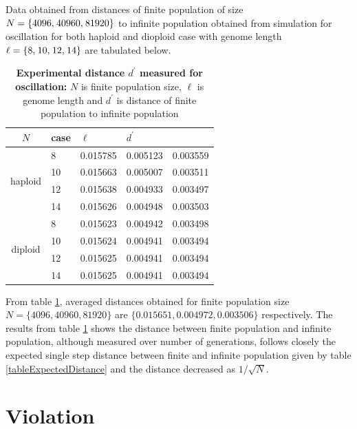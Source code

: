 Data obtained from distances of finite population of size $N = \{4096, \hspace{0.01in} 40960, \hspace{0.01in} 81920\}$ to infinite population obtained from simulation 
for oscillation for both haploid and dioploid case with genome length $\ell = \{8, \hspace{0.01in} 10, \hspace{0.01in} 12, \hspace{0.01in} 14\}$ are tabulated below.
\begin{table}[ht]
\caption{\textbf{Experimental distance $d^\prime$ measured for oscillation:} $N$ is finite population size, $\ell$ is genome length and $d^\prime$ is distance of finite population to infinite population}
\centering
\begin{tabularx}{0.75\textwidth}{ c *{4}{X}}
\toprule
$N$ & case & $\ell$ & $d^\prime$ \\
\midrule
\multirow{4}{*}{haploid} 	& 8 & 0.015785 & 0.005123 & 0.003559 \\
 				& 10 & 0.015663 & 0.005007 & 0.003511 \\ 
 			 	& 12 & 0.015638 & 0.004933 & 0.003497 \\
 	 			& 14 & 0.015626 & 0.004948 & 0.003503 \\ 
\midrule
\multirow{4}{*}{diploid} 	& 8 & 0.015623 & 0.004942 & 0.003498 \\
				& 10 & 0.015624 & 0.004941 & 0.003494 \\
			 	& 12 & 0.015625 & 0.004941 & 0.003494 \\
	 			& 14 & 0.015625 & 0.004941 & 0.003494 \\
\bottomrule

\end{tabularx}
\label{tableDistanceOsc}
\end{table}


From table \ref{tableDistanceOsc}, averaged distances obtained for finite population size $N = \{4096,  40960,  81920\}$ are $\{0.015651, 0.004972, 0.003506\} $ respectively.
The results from table \ref{tableDistanceOsc} shows the distance between finite population and infinite population, although measured over number of generations, follows closely 
the expected single step distance between finite and infinite population given by  table \ref{tableExpectedDistance} and the distance decreased as $1/\sqrt{N}$.






\newpage

\section{Violation}

